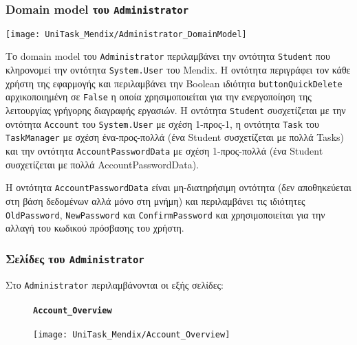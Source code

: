             \subsubsection{Domain model του \texttt{Administrator}}
                \begin{center}
                    \texttt{[image: UniTask\_Mendix/Administrator\_DomainModel]}
                \end{center}

                Το domain model του \texttt{Administrator} περιλαμβάνει την οντότητα \texttt{Student} που κληρονομεί την οντότητα \texttt{System.User} του Mendix. Η οντότητα περιγράφει τον κάθε χρήστη της εφαρμογής και περιλαμβάνει την Boolean ιδιότητα \texttt{buttonQuickDelete} αρχικοποιημένη σε \texttt{False} η οποία χρησιμοποιείται για την ενεργοποίηση της λειτουργίας γρήγορης διαγραφής εργασιών. Η οντότητα \texttt{Student} συσχετίζεται με την οντότητα \texttt{Account} του \texttt{System.User} με σχέση 1-προς-1, η οντότητα \texttt{Task} του \texttt{TaskManager} με σχέση ένα-προς-πολλά (ένα Student συσχετίζεται με πολλά Tasks) και την οντότητα \texttt{AccountPasswordData} με σχέση 1-προς-πολλά (ένα Student συσχετίζεται με πολλά AccountPasswordData).

                Η οντότητα \texttt{AccountPasswordData} είναι μη-διατηρήσιμη οντότητα (δεν αποθηκεύεται στη βάση δεδομένων αλλά μόνο στη μνήμη) και περιλαμβάνει τις ιδιότητες \texttt{OldPassword}, \texttt{NewPassword} και \texttt{ConfirmPassword} και χρησιμοποιείται για την αλλαγή του κωδικού πρόσβασης του χρήστη.

            \subsubsection{Σελίδες του \texttt{Administrator}}
                Στο \texttt{Administrator} περιλαμβάνονται οι εξής σελίδες:

                \begin{figure}[H] \noindent
                    \paragraph{\texttt{Account\_Overview}}
                    \begin{center}
                        \texttt{[image: UniTask\_Mendix/Account\_Overview]}
                    \end{center}
                \end{figure}

